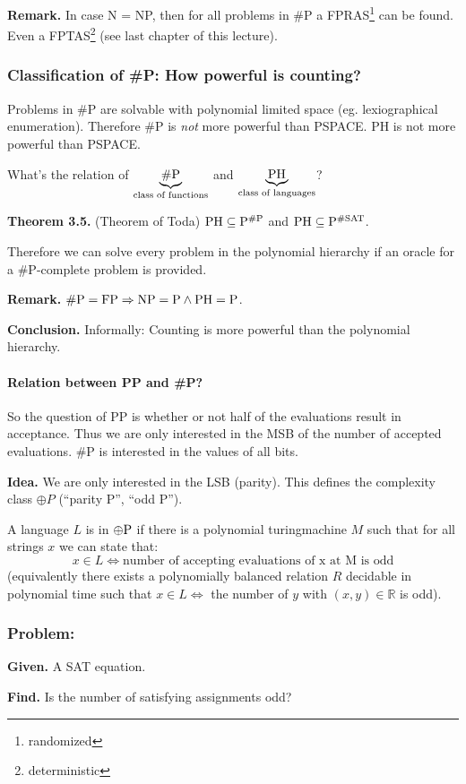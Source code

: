 \documentclass[a4paper]{article}
\newcommand{\given}[1]{\textbf{Given.} #1\par}
\newcommand{\find}[1]{\textbf{Find.} #1\par}
\newcommand{\cls}[1]{\rm{#1}}
\newcommand{\probl}[1]{\text{\textsc{#1}}}
\newenvironment{spec}[0]{\begin{framed}}{\end{framed}}
\begin{document}
\textbf{Remark.}
In case N = \cls{NP}, then for all problems in \cls{\#P} a \cls{FP}RAS\footnote{randomized}
can be found. Even a \cls{FPTAS}\footnote{deterministic}
(see last chapter of this lecture).

\subsubsection{Classification of \cls{\#P}: How powerful is counting?}
%
Problems in \cls{\#P} are solvable with polynomial limited space
(eg. lexiographical enumeration). Therefore \cls{\#P} is \emph{not}
more powerful than PSPACE. PH is not more powerful than PSPACE.

What's the relation of $\underbrace{\cls{\#P}}_{\text{class of functions}}$
and $\underbrace{\cls{PH}}_{\text{class of languages}}$?

\textbf{Theorem 3.5.} (Theorem of Toda) $\cls{PH} \subseteq P^{\cls{\#P}}$ and
  $\cls{PH} \subseteq P^{\cls{\#SAT}}$.

Therefore we can solve every problem in the polynomial hierarchy
if an oracle for a \cls{\#P}-complete problem is provided.

\textbf{Remark.}
  $\cls{\#P} = \cls{FP} \Rightarrow \cls{NP} = \cls{P} \land \cls{PH} = \cls{P}$.

\textbf{Conclusion.}
  Informally: Counting is more powerful than the polynomial hierarchy.

\paragraph{Relation between PP and \cls{\#P}?}
  So the question of PP is whether or not half of the evaluations result
  in acceptance. Thus we are only interested in the MSB of the number of
  accepted evaluations. \cls{\#P} is interested in the values of all bits.

\textbf{Idea.}
  We are only interested in the LSB (parity). This defines the complexity class
  $\oplus P$ (``parity P'', ``odd P'').

A language $L$ is in $\cls{\oplus P}$ if there is a polynomial turingmachine
$M$ such that for all strings $x$ we can state that:
\[
  x \in L \Leftrightarrow \text{number of accepting evaluations of x at M is odd}
\]
(equivalently there exists a polynomially balanced relation $R$
decidable in polynomial time such that $x \in L \Leftrightarrow$ the number of $y$
with $(x, y) \in \mathbb{R}$ is odd).

\subsubsection{Problem: \probl{$\oplus$ SAT}}
%
\begin{spec}
  \given{A SAT equation.}
  \find{Is the number of satisfying assignments odd?}
\end{spec}
\end{document}
